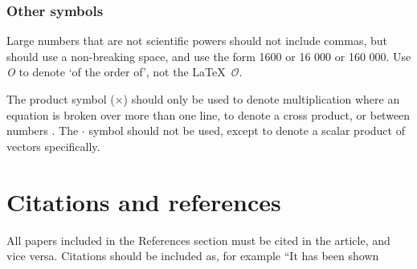 \documentclass[lineno]{jfm}
\begin{document}
\subsubsection{Other symbols}  Large numbers  that are not scientific powers should not include commas, but should use a non-breaking space, and use the form 1600 or 16 000 or 160 000.
Use \textit{O} to denote `of the order of', not the \LaTeX\ $\mathcal{O}$.

The product symbol ($\times$) should only be used to denote multiplication where an equation is broken over more than one line, to denote a cross product, or between numbers . The $\boldsymbol {\cdot}$ symbol should not be used, except to denote a scalar product of vectors specifically.

\section{Citations and references}
All papers included in the References section must be cited in the article, and vice versa. Citations should be included as, for example ``It has been shown
\end{document}
